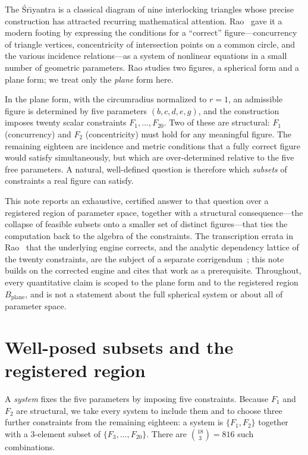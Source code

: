 \documentclass[11pt]{article}
\newcommand{\sri}{\'Sr\={\i}yantra}
\newcommand{\Bplane}{B_{\mathrm{plane}}}
\begin{document}
The \sri{} is a classical diagram of nine interlocking triangles whose precise construction has attracted recurring mathematical attention. Rao~\cite{Rao1998} gave it a modern footing by expressing the conditions for a ``correct'' figure---concurrency of triangle vertices, concentricity of intersection points on a common circle, and the various incidence relations---as a system of nonlinear equations in a small number of geometric parameters. Rao studies two figures, a spherical form and a plane form; we treat only the \emph{plane} form here.

In the plane form, with the circumradius normalized to $r=1$, an admissible figure is determined by five parameters $(b,c,d,e,g)$, and the construction imposes twenty scalar constraints $F_1,\dots,F_{20}$. Two of these are structural: $F_1$ (concurrency) and $F_2$ (concentricity) must hold for any meaningful figure. The remaining eighteen are incidence and metric conditions that a fully correct figure would satisfy simultaneously, but which are over-determined relative to the five free parameters. A natural, well-defined question is therefore which \emph{subsets} of constraints a real figure can satisfy.

This note reports an exhaustive, certified answer to that question over a registered region of parameter space, together with a structural consequence---the collapse of feasible subsets onto a smaller set of distinct figures---that ties the computation back to the algebra of the constraints. The transcription errata in Rao~\cite{Rao1998} that the underlying engine corrects, and the analytic dependency lattice of the twenty constraints, are the subject of a separate corrigendum~\cite{Corrigendum}; this note builds on the corrected engine and cites
that work as a prerequisite. Throughout, every quantitative claim is scoped to the plane form and to the registered region $\Bplane$, and is not a statement about the full spherical system or about all of parameter space.

\section{Well-posed subsets and the registered region}

A \emph{system} fixes the five parameters by imposing five constraints. Because $F_1$ and $F_2$ are structural, we take every system to include them and to choose three further constraints from the remaining eighteen: a system is $\{F_1,F_2\}$ together with a $3$-element subset of $\{F_3,\dots,F_{20}\}$. There are $\binom{18}{3}=816$ such combinations.
\end{document}
